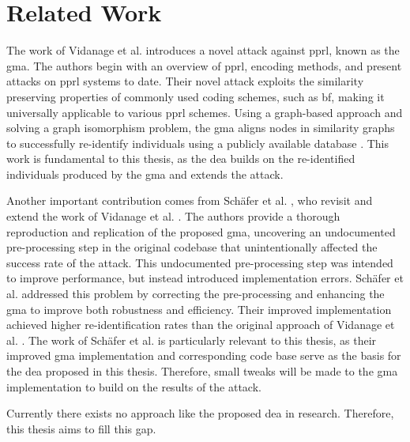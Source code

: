 \section{Related Work}  \label{sec:rel-work}

The work of Vidanage et al. \cite{vidanage2020graph} introduces a novel attack against \ac{pprl}, known as the \ac{gma}.
The authors begin with an overview of \ac{pprl}, encoding methods, and present attacks on \ac{pprl} systems to date.
Their novel attack exploits the similarity preserving properties of commonly used coding schemes, such as \ac{bf}, making it universally applicable to various \ac{pprl} schemes.
Using a graph-based approach and solving a graph isomorphism problem, the \ac{gma} aligns nodes in similarity graphs to successfully re-identify individuals using a publicly available database \cite{vidanage2020graph}.
This work is fundamental to this thesis, as the \ac{dea} builds on the re-identified individuals produced by the \ac{gma} and extends the attack.

Another important contribution comes from Schäfer et al. \cite{schaefer2024}, who revisit and extend the work of Vidanage et al. \cite{vidanage2020graph}.
The authors provide a thorough reproduction and replication of the proposed \ac{gma}, uncovering an undocumented pre-processing step in the original codebase that unintentionally affected the success rate of the attack.
This undocumented pre-processing step was intended to improve performance, but instead introduced implementation errors.
Schäfer et al. addressed this problem by correcting the pre-processing and enhancing the \ac{gma} to improve both robustness and efficiency.
Their improved implementation achieved higher re-identification rates than the original approach of Vidanage et al. \cite{schaefer2024}.
The work of Schäfer et al. is particularly relevant to this thesis, as their improved \ac{gma} implementation and corresponding code base serve as the basis for the \ac{dea} proposed in this thesis.
Therefore, small tweaks will be made to the \ac{gma} implementation to build on the results of the attack.

Currently there exists no approach like the proposed \ac{dea} in research. Therefore, this thesis aims to fill this gap.


